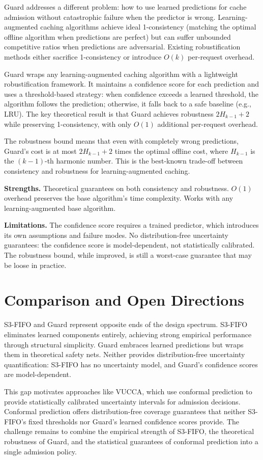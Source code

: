 \documentclass[11pt,letterpaper]{article}
\begin{document}
Guard \citep{Chen2025} addresses a different problem: how to use learned predictions for cache admission without catastrophic failure when the predictor is wrong. Learning-augmented caching algorithms achieve ideal 1-consistency (matching the optimal offline algorithm when predictions are perfect) but can suffer unbounded competitive ratios when predictions are adversarial. Existing robustification methods either sacrifice 1-consistency or introduce $O(k)$ per-request overhead.

Guard wraps any learning-augmented caching algorithm with a lightweight robustification framework. It maintains a confidence score for each prediction and uses a threshold-based strategy: when confidence exceeds a learned threshold, the algorithm follows the prediction; otherwise, it falls back to a safe baseline (e.g., LRU). The key theoretical result is that Guard achieves robustness $2H_{k-1} + 2$ while preserving 1-consistency, with only $O(1)$ additional per-request overhead.

The robustness bound means that even with completely wrong predictions, Guard's cost is at most $2H_{k-1} + 2$ times the optimal offline cost, where $H_{k-1}$ is the $(k-1)$-th harmonic number. This is the best-known trade-off between consistency and robustness for learning-augmented caching.

\textbf{Strengths.} Theoretical guarantees on both consistency and robustness. $O(1)$ overhead preserves the base algorithm's time complexity. Works with any learning-augmented base algorithm.

\textbf{Limitations.} The confidence score requires a trained predictor, which introduces its own assumptions and failure modes. No distribution-free uncertainty guarantees: the confidence score is model-dependent, not statistically calibrated. The robustness bound, while improved, is still a worst-case guarantee that may be loose in practice.

\section{Comparison and Open Directions}

S3-FIFO and Guard represent opposite ends of the design spectrum. S3-FIFO eliminates learned components entirely, achieving strong empirical performance through structural simplicity. Guard embraces learned predictions but wraps them in theoretical safety nets. Neither provides distribution-free uncertainty quantification: S3-FIFO has no uncertainty model, and Guard's confidence scores are model-dependent.

This gap motivates approaches like VUCCA, which use conformal prediction to provide statistically calibrated uncertainty intervals for admission decisions. Conformal prediction offers distribution-free coverage guarantees that neither S3-FIFO's fixed thresholds nor Guard's learned confidence scores provide. The challenge remains to combine the empirical strength of S3-FIFO, the theoretical robustness of Guard, and the statistical guarantees of conformal prediction into a single admission policy.



\end{document}

